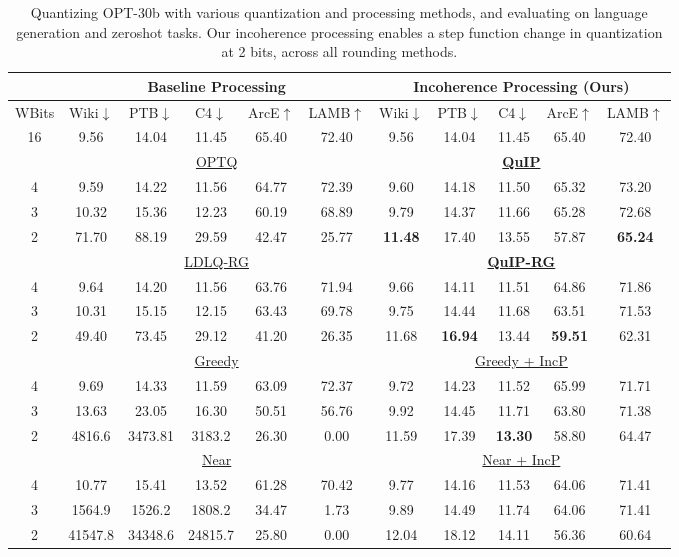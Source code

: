 \begin{table}[]
\centering
\small
\begin{tabular}{c|ccccc|ccccc}
& \multicolumn{5}{c|}{Baseline Processing} & \multicolumn{5}{c}{Incoherence Processing (Ours)} \\
\hline
WBits\Tstrut\Bstrut & 
Wiki$\downarrow$ & PTB$\downarrow$ & C4$\downarrow$ & ArcE$\uparrow$ & LAMB$\uparrow$ & 
Wiki$\downarrow$ & PTB$\downarrow$ & C4$\downarrow$ & ArcE$\uparrow$  & LAMB$\uparrow$\\
\hline
16\Tstrut & 9.56 & 14.04 & 11.45 & 65.40 & 72.40 & 9.56 & 14.04 & 11.45 & 65.40 & 72.40 \\
\hline
& \multicolumn{5}{c|}{\underline{OPTQ}}\Tstrut & \multicolumn{5}{c}{\underline{\textbf{QuIP}}} \\
4 & 
9.59 & 14.22 & 11.56 & 64.77 & 72.39 & 
9.60 & 14.18 & 11.50 & 65.32 & 73.20\\
3 & 
10.32 & 15.36 & 12.23 & 60.19 & 68.89 &
9.79 & 14.37 & 11.66 & 65.28 & 72.68
\\
2 & 
71.70 & 88.19 & 29.59 & 42.47 & 25.77 &
\textbf{11.48} & 17.40 & 13.55 & 57.87 & \textbf{65.24}
\\
\hline
& \multicolumn{5}{c|}{\underline{LDLQ-RG}}\Tstrut & \multicolumn{5}{c}{\underline{\textbf{QuIP-RG}}} \\
4 &
9.64 & 14.20 & 11.56 & 63.76 & 71.94 &
9.66 & 14.11 & 11.51 & 64.86 & 71.86 
\\
3 &
10.31 & 15.15 & 12.15 & 63.43 & 69.78 &
9.75 & 14.44 & 11.68 & 63.51 & 71.53 
\\
2 &
49.40 & 73.45 & 29.12 & 41.20 & 26.35 &
11.68 & \textbf{16.94} & 13.44 & \textbf{59.51} & 62.31 
\\
\hline
& \multicolumn{5}{c|}{\underline{Greedy}}\Tstrut & \multicolumn{5}{c}{\underline{Greedy + IncP}} \\
4 &
9.69 & 14.33 & 11.59 & 63.09 & 72.37 &
9.72 & 14.23 & 11.52 & 65.99 & 71.71 
\\
3 &
13.63 & 23.05 & 16.30 & 50.51 & 56.76 &
9.92 & 14.45 & 11.71 & 63.80 & 71.38 
\\
2 &
4816.6 & 3473.81 & 3183.2 & 26.30 & 0.00 &
11.59 & 17.39 & \textbf{13.30} & 58.80 & 64.47 
\\
\hline
& \multicolumn{5}{c|}{\underline{Near}}\Tstrut & \multicolumn{5}{c}{\underline{Near + IncP}} \\
4 &
10.77 & 15.41 & 13.52 & 61.28 & 70.42 &
9.77 & 14.16 & 11.53 & 64.06 & 71.41
\\
3 &
1564.9 & 1526.2 & 1808.2 & 34.47 & 1.73 &
9.89 & 14.49 & 11.74 & 64.06 & 71.41
\\
2 &
41547.8 & 34348.6 & 24815.7 & 25.80 & 0.00 &
12.04 & 18.12 & 14.11 & 56.36 & 60.64
\\
\hline
\end{tabular}
\caption{
Quantizing OPT-30b with various quantization and processing methods, and evaluating on language generation and zeroshot tasks.
Our incoherence processing enables a step function change in quantization at 2 bits, across all rounding methods.
}
\label{tabMainRes}
\end{table}

